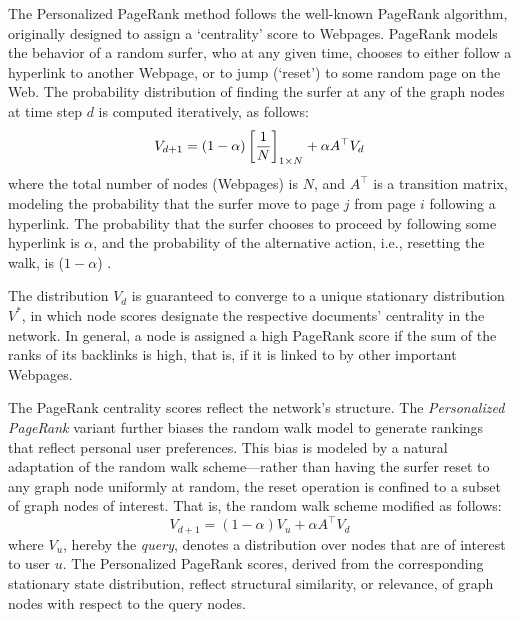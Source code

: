 \documentclass[ijoc,nonblindrev]{informs3} %
\numberwithin{equation}{subsection}
\begin{document}
The Personalized PageRank method follows the well-known PageRank algorithm, originally designed to assign a `centrality' score to Webpages. PageRank models the behavior of a random surfer, who at any given time, chooses to either follow a hyperlink to another Webpage, or to jump (`reset') to some random page on the Web. The probability distribution of finding the surfer at any of the graph nodes at time step $d$ is computed iteratively, as follows:
\begin{equation}
V_{d+1} = (1-\alpha) \left[{1 \over N}\right]_{1 \times N} + \alpha A^\top V_d
\label{eq:pagerank}
\end{equation}
where the total number of nodes (Webpages) is $N$, and $A^\top$
is a transition matrix, modeling the probability that the surfer move
to page $j$ from page $i$ following a hyperlink. The probability that
the surfer chooses to proceed by following some hyperlink is $\alpha$, and the probability of the alternative action, i.e., resetting the walk, is ($1-\alpha$) .

The distribution $V_d$ is guaranteed to converge to a unique stationary distribution $V^*$, in which node scores designate the respective documents' centrality in the network. In general, a node is assigned a high PageRank score if the sum of the ranks of its backlinks is high, that is, if it is linked to by other important Webpages.

The PageRank centrality scores reflect the network's structure. The {\it Personalized PageRank} variant further biases the random walk model to
generate rankings that reflect personal user preferences. This bias is modeled by a natural adaptation of the random walk scheme---rather than having the surfer reset to any graph node uniformly at random, the reset operation is confined to a subset of graph nodes of interest. That is, the random walk scheme modified as follows:
\begin{equation}
V_{d+1} = (1-\alpha) V_u + \alpha A^\top V_d
\label{eq:ppr}
\end{equation}
where $V_u$, hereby the {\it query}, denotes a distribution over nodes that are of interest to user $u$. The Personalized PageRank scores, derived from the corresponding stationary state distribution, reflect structural similarity, or relevance, of graph nodes with respect to the query nodes.
\end{document}
